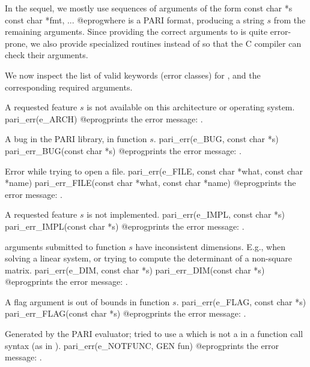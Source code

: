 \noindent In the sequel, we mostly use sequences of arguments of the form
\bprog
  const char *s
  const char *fmt, ...
@eprog\noindent where  is a PARI
format, producing a string $s$ from the remaining arguments. Since
providing the correct arguments to  is quite error-prone, we
also provide specialized routines 
instead of  so that the C compiler
can check their arguments.

\noindent We now inspect the list of valid keywords (error classes) for
, and the corresponding required arguments.


 A requested feature $s$ is not available on this
architecture or operating system.
\bprog
  pari_err(e_ARCH)
@eprog\noindent prints the error message: .

 A bug in the PARI library, in function $s$.
\bprog
  pari_err(e_BUG, const char *s)
  pari_err_BUG(const char *s)
@eprog\noindent prints the error message: .

 Error while trying to open a file.
\bprog
  pari_err(e_FILE, const char *what, const char *name)
  pari_err_FILE(const char *what, const char *name)
@eprog\noindent prints the error message: .

 A requested feature $s$ is not implemented.
\bprog
  pari_err(e_IMPL, const char *s)
  pari_err_IMPL(const char *s)
@eprog\noindent prints the error message: .


 arguments submitted to function $s$ have inconsistent
dimensions. E.g., when solving a linear system, or trying to compute the
determinant of a non-square matrix.
\bprog
  pari_err(e_DIM, const char *s)
  pari_err_DIM(const char *s)
@eprog\noindent prints the error message: .

 A flag argument is out of bounds in function $s$.
\bprog
  pari_err(e_FLAG, const char *s)
  pari_err_FLAG(const char *s)
@eprog\noindent prints the error message: .

 Generated by the PARI evaluator; tried to use a
 which is not a  in a function call syntax (as in
).
\bprog
  pari_err(e_NOTFUNC, GEN fun)
@eprog\noindent prints the error message: .

